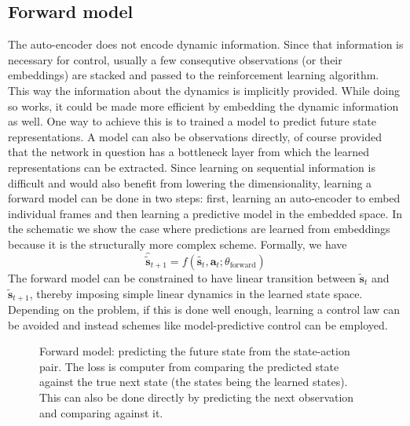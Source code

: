 \subsection{Forward model}
The auto-encoder does not encode dynamic information.
Since that information is necessary for control, usually a few consequtive
observations (or their embeddings) are stacked and passed to the reinforcement learning algorithm.
This way the information about the dynamics is implicitly provided.
While doing so works, it could be made more efficient by embedding the dynamic
information as well.
One way to achieve this is to trained a model to predict future state representations.
A model can also be observations directly, 
of course provided that the network in question has a bottleneck layer from which
the learned representations can be extracted.
Since learning on sequential information is difficult and would also benefit from
lowering the dimensionality, learning a forward model can be done in two steps:
first, learning an auto-encoder to embed individual frames and then 
learning a predictive model in the embedded space.
In the schematic we show the case where predictions are learned from embeddings
because it is the structurally more complex scheme.
Formally, we have
\begin{equation}
		\hat{\tilde{\bm{s}}}_{ t+1 } = f (\tilde{\bm{s}_{t}}, \bm{a}_{t}; \theta_{ \text{forward} })
\end{equation}
The forward model can be constrained to have linear transition between 
$ \tilde{\bm{s}}_{t}  $ and $ \tilde{\bm{s}}_{t+1}  $, thereby
imposing simple linear dynamics in the learned state space.
Depending on the problem, if this is done well enough, learning a control law can be avoided and instead
schemes like model-predictive control can be employed.

\begin{figure}[htpb]
\begin{center}
\end{center}
		\caption{Forward model: predicting the future state from the state-action pair.
				The loss is computer from comparing the predicted state against the true next state
				(the states being the learned states).
				This can also be done directly by predicting the next observation and comparing against it.
				}
\end{figure}



